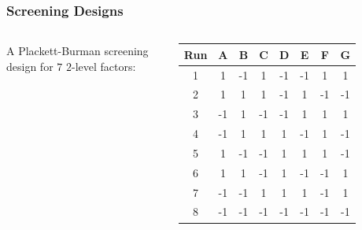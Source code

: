 \documentclass[10pt, compress, aspectratio=169, xcolor={table,usenames,dvipsnames}]{beamer}
\begin{document}
\begin{frame}
    \frametitle{Screening Designs}
    \begin{columns}[c]
            \vspace{.4cm}

            A Plackett-Burman \alert{screening design} for $7$
            \alert{$2$-level factors}:

            \vspace{.2cm}

            \begin{table}[]
                \centering
                \begin{tabular}{@{}cccccccc@{}}
                    \toprule
                    Run & A & B & C & D & E & F & G \\ \midrule
                    \cellcolor{gray!18}1 & \cellcolor{green!25}1 & \cellcolor{red!25}-1 & \cellcolor{green!25}1 & \cellcolor{red!25}-1 & \cellcolor{red!25}-1 & \cellcolor{green!25}1 & \cellcolor{green!25}1 \\
                    \cellcolor{gray!18}2 & \cellcolor{green!25}1 & \cellcolor{green!25}1 & \cellcolor{green!25}1 & \cellcolor{red!25}-1 & \cellcolor{green!25}1 & \cellcolor{red!25}-1 & \cellcolor{red!25}-1 \\
                    \cellcolor{gray!18}3 & \cellcolor{red!25}-1 & \cellcolor{green!25}1 & \cellcolor{red!25}-1 & \cellcolor{red!25}-1 & \cellcolor{green!25}1 & \cellcolor{green!25}1 & \cellcolor{green!25}1 \\
                    \cellcolor{gray!18}4 & \cellcolor{red!25}-1 & \cellcolor{green!25}1 & \cellcolor{green!25}1 & \cellcolor{green!25}1 & \cellcolor{red!25}-1 & \cellcolor{green!25}1 & \cellcolor{red!25}-1 \\
                    \cellcolor{gray!18}5 & \cellcolor{green!25}1 & \cellcolor{red!25}-1 & \cellcolor{red!25}-1 & \cellcolor{green!25}1 & \cellcolor{green!25}1 & \cellcolor{green!25}1 & \cellcolor{red!25}-1 \\
                    \cellcolor{gray!18}6 & \cellcolor{green!25}1 & \cellcolor{green!25}1 & \cellcolor{red!25}-1 & \cellcolor{green!25}1 & \cellcolor{red!25}-1 & \cellcolor{red!25}-1 & \cellcolor{green!25}1 \\
                    \cellcolor{gray!18}7 & \cellcolor{red!25}-1 & \cellcolor{red!25}-1 & \cellcolor{green!25}1 & \cellcolor{green!25}1 & \cellcolor{green!25}1 & \cellcolor{red!25}-1 & \cellcolor{green!25}1 \\
                    \cellcolor{gray!18}8 & \cellcolor{red!25}-1 & \cellcolor{red!25}-1 & \cellcolor{red!25}-1 & \cellcolor{red!25}-1 & \cellcolor{red!25}-1 & \cellcolor{red!25}-1 & \cellcolor{red!25}-1  \\ \bottomrule
                \end{tabular}
            \end{table}


\end{columns}
\end{frame}
\end{document}
